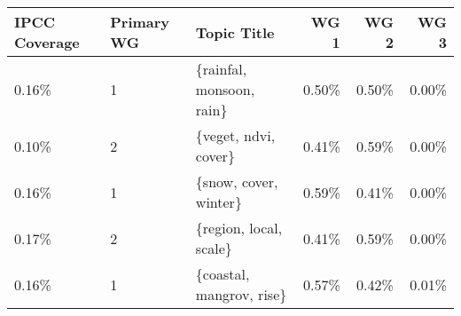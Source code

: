 \begin{tabular}{p{1.4cm} p{1cm} l r r r}
\toprule
 IPCC Coverage &  Primary WG &               Topic Title &  WG 1 &  WG 2 &  WG 3 \\
\midrule
         0.16\% &           1 &  \{rainfal, monsoon, rain\} & 0.50\% & 0.50\% & 0.00\% \\
         0.10\% &           2 &      \{veget, ndvi, cover\} & 0.41\% & 0.59\% & 0.00\% \\
         0.16\% &           1 &     \{snow, cover, winter\} & 0.59\% & 0.41\% & 0.00\% \\
         0.17\% &           2 &    \{region, local, scale\} & 0.41\% & 0.59\% & 0.00\% \\
         0.16\% &           1 &  \{coastal, mangrov, rise\} & 0.57\% & 0.42\% & 0.01\% \\
\bottomrule
\end{tabular}
